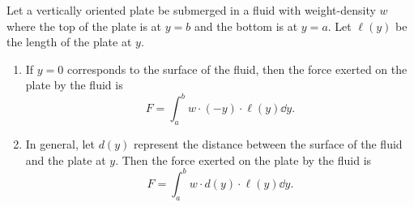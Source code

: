 \begin{keyidea}\label{idea:fluid_force}
Let a vertically oriented plate be submerged in a fluid with weight-density $w$ where the top of the plate is at $y=b$ and the bottom is at $y=a$. Let $\ell(y)$ be the length of the plate at $y$.
\begin{enumerate}
	\item	If $y=0$ corresponds to the surface of the fluid, then the force exerted on the plate by the fluid is
	\[F=\int_a^b w\cdot(-y)\cdot\ell(y)\dd y.\]
	\item	In general, let $d(y)$ represent the distance between the surface of the fluid and the plate at $y$. Then the force exerted on the plate by the fluid is 
	\[F=\int_a^b w\cdot d(y)\cdot\ell(y)\dd y.\]
\end{enumerate}
\end{keyidea}

